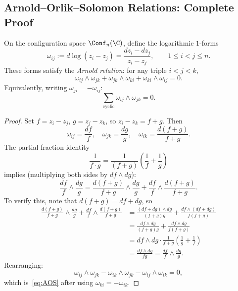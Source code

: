 \subsection{Arnold--Orlik--Solomon Relations: Complete Proof}
\label{subsec:arnold_complete}

\begin{theorem}
\label{thm:AOS_forms}
On the configuration space $\Conf_n(\C)$, define the logarithmic $1$-forms
\[
\omega_{ij} := d\log(z_i - z_j) = \frac{dz_i - dz_j}{z_i - z_j}, \qquad 1 \leq i < j \leq n.
\]
These forms satisfy the \emph{Arnold relation}: for any triple $i < j < k$,
\begin{equation}
\label{eq:AOS}
\omega_{ij} \wedge \omega_{jk} + \omega_{jk} \wedge \omega_{ki} + \omega_{ki} \wedge \omega_{ij} = 0.
\end{equation}
Equivalently, writing $\omega_{ji} = -\omega_{ij}$:
\[
\sum_{\text{cyclic}} \omega_{ij} \wedge \omega_{jk} = 0.
\]
\end{theorem}

\begin{proof}
Set $f = z_i - z_j$, $g = z_j - z_k$, so $z_i - z_k = f + g$. Then
\[
\omega_{ij} = \frac{df}{f}, \quad \omega_{jk} = \frac{dg}{g}, \quad \omega_{ik} = \frac{d(f+g)}{f+g}.
\]
The partial fraction identity
\[
\frac{1}{f \cdot g} = \frac{1}{(f+g)} \left(\frac{1}{f} + \frac{1}{g}\right)
\]
implies (multiplying both sides by $df \wedge dg$):
\[
\frac{df}{f} \wedge \frac{dg}{g} = \frac{d(f+g)}{f+g} \wedge \frac{dg}{g} + \frac{df}{f} \wedge \frac{d(f+g)}{f+g}.
\]
To verify this, note that $d(f+g) = df + dg$, so
\begin{align*}
\frac{d(f+g)}{f+g} \wedge \frac{dg}{g} + \frac{df}{f} \wedge \frac{d(f+g)}{f+g}
&= \frac{(df+dg) \wedge dg}{(f+g)g} + \frac{df \wedge (df+dg)}{f(f+g)} \\
&= \frac{df \wedge dg}{(f+g)g} + \frac{df \wedge dg}{f(f+g)} \\
&= df \wedge dg \cdot \frac{1}{f+g}\left(\frac{1}{g} + \frac{1}{f}\right) \\
&= \frac{df \wedge dg}{fg} = \frac{df}{f} \wedge \frac{dg}{g}.
\end{align*}
Rearranging:
\[
\omega_{ij} \wedge \omega_{jk} - \omega_{ik} \wedge \omega_{jk} - \omega_{ij} \wedge \omega_{ik} = 0,
\]
which is~\eqref{eq:AOS} after using $\omega_{ki} = -\omega_{ik}$.
\end{proof}

